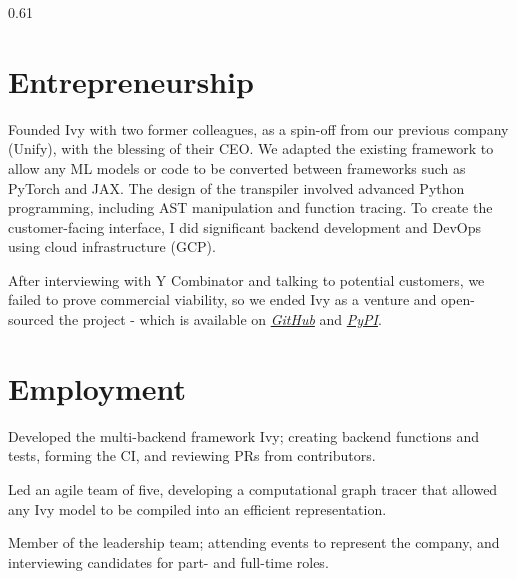 \documentclass{CV}
\begin{document}
\begin{cvcolumn}{0.61\textwidth}
\sectionsep

\section{Entrepreneurship}
\sectionrule

\par
{}\par
Founded Ivy with two former colleagues, as a spin-off from our previous company (Unify), with the blessing of their CEO.
We adapted the existing framework to allow any ML models or code to be converted between frameworks such
as PyTorch and JAX.
The design of the transpiler involved advanced Python programming, including AST manipulation and function tracing.
To create the customer-facing interface, I did significant backend development and DevOps using cloud infrastructure (GCP).

\vspace{2pt}
After interviewing with Y Combinator and talking to potential customers, we failed to prove commercial viability, so we
ended Ivy as a venture and open-sourced the project - which is available on \href{https://github.com/unifyai/ivy}{\textit{GitHub}}
and \href{https://pypi.org/project/ivy/}{\textit{PyPI}}.

\sectionsep

\section{Employment}
\sectionrule

\par
{}
\begin{tightemize}
  \item Developed the multi-backend framework Ivy; creating backend functions and tests, forming the CI, and reviewing PRs from contributors.
  \item Led an agile team of five, developing a computational graph tracer that allowed any Ivy model to be compiled into an efficient representation.
  \item Member of the leadership team; attending events to represent the company, and interviewing candidates for part- and full-time roles.
\end{tightemize}


\end{cvcolumn}
\end{document}
